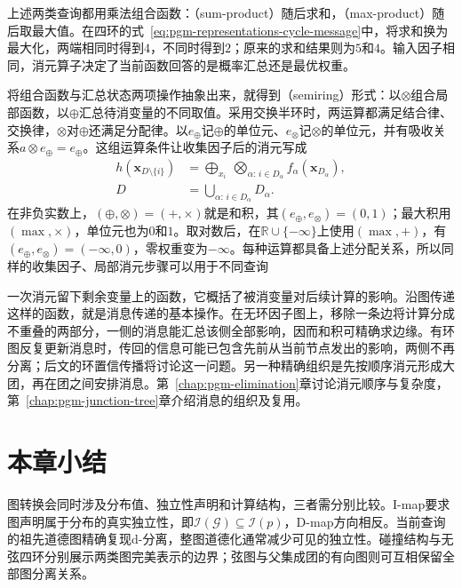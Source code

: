 上述两类查询都用乘法组合函数：（sum-product）随后求和，（max-product）随后取最大值。在四环的式~\eqref{eq:pgm-representations-cycle-message}中，将求和换为最大化，两端相同时得到$4$，不同时得到$2$；原来的求和结果则为$5$和$4$。输入因子相同，消元算子决定了当前函数回答的是概率汇总还是最优权重。

将组合函数与汇总状态两项操作抽象出来，就得到（semiring）形式：以$\otimes$组合局部函数，以$\oplus$汇总待消变量的不同取值。采用交换半环时，两运算都满足结合律、交换律，$\otimes$对$\oplus$还满足分配律。以$e_\oplus$记$\oplus$的单位元、$e_\otimes$记$\otimes$的单位元，并有吸收关系$a\otimes e_\oplus=e_\oplus$。这组运算条件让收集因子后的消元写成
\begin{equation}
  \begin{aligned}
    h(\bm{x}_{D\setminus\{i\}})
    &=
    \bigoplus_{x_i}
    \ \bigotimes_{\alpha:\,i\in D_\alpha}
    f_\alpha(\bm{x}_{D_\alpha}),\\
    D&=\bigcup_{\alpha:\,i\in D_\alpha}D_\alpha.
  \end{aligned}
  \label{eq:pgm-representations-semiring-elimination}
\end{equation}
在非负实数上，$(\oplus,\otimes)=(+,\times)$就是和积，其$(e_\oplus,e_\otimes)=(0,1)$；最大积用$(\max,\times)$，单位元也为$0$和$1$。取对数后，在$\mathbb{R}\cup\{-\infty\}$上使用$(\max,+)$，有$(e_\oplus,e_\otimes)=(-\infty,0)$，零权重变为$-\infty$。每种运算都具备上述分配关系，所以同样的收集因子、局部消元步骤可以用于不同查询

一次消元留下剩余变量上的函数，它概括了被消变量对后续计算的影响。沿图传递这样的函数，就是消息传递的基本操作。在无环因子图上，移除一条边将计算分成不重叠的两部分，一侧的消息能汇总该侧全部影响，因而和积可精确求边缘。有环图反复更新消息时，传回的信息可能已包含先前从当前节点发出的影响，两侧不再分离；后文的环置信传播将讨论这一问题。另一种精确组织是先按顺序消元形成大团，再在团之间安排消息。第~\ref{chap:pgm-elimination}章讨论消元顺序与复杂度，第~\ref{chap:pgm-junction-tree}章介绍消息的组织及复用。

\section{本章小结}
\label{sec:pgm-representations-summary}

图转换会同时涉及分布值、独立性声明和计算结构，三者需分别比较。I-map要求图声明属于分布的真实独立性，即$\mathcal{I}(\mathcal{G})\subseteq\mathcal{I}(p)$，D-map方向相反。当前查询的祖先道德图精确复现d-分离，整图道德化通常减少可见的独立性。碰撞结构与无弦四环分别展示两类图完美表示的边界；弦图与父集成团的有向图则可互相保留全部图分离关系。

